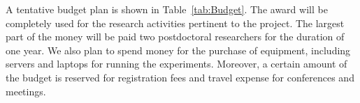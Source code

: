 \begin{table}[t!]
\begin{tabular}{|p{0.80cm}|p{4.80cm}|p{0.40cm}|p{0.40cm}|p{0.40cm}|p{0.40cm}|p{0.40cm}|p{0.40cm}|p{0.40cm}|p{0.40cm}|p{0.40cm}|p{0.40cm}|p{0.40cm}|p{0.40cm}|}
	\end{tabular}
	\label{tab:GanttChart}
\end{table}








A tentative budget plan is shown in Table~\ref{tab:Budget}. The award will be completely used for the research activities pertinent to the project. The largest part of the money will be paid two postdoctoral researchers for the duration of one year. We also plan to spend money for the purchase of equipment, including servers and laptops for running the experiments. Moreover, a certain amount of the budget is reserved for registration fees and travel expense for conferences and meetings. %



